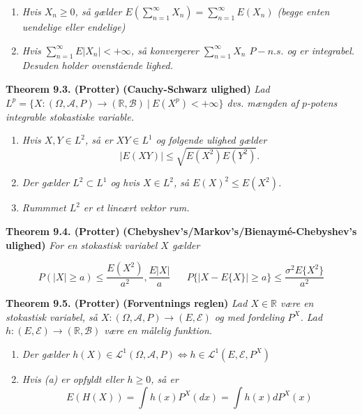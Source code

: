 \documentclass[a4paper,12pt,openany]{book}
\providecommand{\tightlist}{%
 \setlength{\itemsep}{0pt}\setlength{\parskip}{0pt}}
\begin{document}
\begin{enumerate}
\def\labelenumi{\alph{enumi}.}
\tightlist
\item
  \emph{Hvis \(X_n\ge0\), så gælder \(E\left(\sum_{n=1}^\infty X_n\right)=\sum_{n=1}^\infty E(X_n)\) (begge enten uendelige eller endelige)}
\item
  \emph{Hvis \(\sum_{n=1}^\infty E\vert X_n\vert <+\infty\), så konvergerer \(\sum_{n=1}^\infty X_n\) \(P-n.s.\) og er integrabel. Desuden holder ovenstående lighed.}
\end{enumerate}

\textbf{Theorem 9.3. (Protter)} \textbf{(Cauchy-Schwarz ulighed)} \emph{Lad \(L^p=\{X : (\Omega,\mathcal{A},P)\to(\mathbb{R},\mathcal{B})\ \vert\ E(X^p)< +\infty\}\) dvs. mængden af \(p\)-potens integrable stokastiske variable.}

\begin{enumerate}
\def\labelenumi{\alph{enumi}.}
\tightlist
\item
  \emph{Hvis \(X,Y\in L^2\), så er \(XY\in L^1\) og følgende ulighed gælder}
  \[
    \vert E(XY)\vert \le \sqrt{E(X^2)E(Y^2)}.
    \]
\item
  \emph{Der gælder \(L^2\subset L^1\) og hvis \(X\in L^2\), så \(E(X)^2\le E(X^2)\).}
\item
  \emph{Rummmet \(L^2\) er et lineært vektor rum.}
\end{enumerate}

\textbf{Theorem 9.4. (Protter)} \textbf{(Chebyshev's/Markov's/Bienaymé-Chebyshev's ulighed)} \emph{For en stokastisk variabel \(X\) gælder}

\[
P(\vert X\vert \ge a)\le \frac{E(X^2)}{a^2},\frac{E\vert X\vert}{a} \hspace{20pt} P\{\vert X-E\{X\}\vert\ge a\}\le \frac{\sigma^2 E\{X^2\}}{a^2}
\]

\textbf{Theorem 9.5. (Protter)} \textbf{(Forventnings reglen)} \emph{Lad \(X\in \mathbb{R}\) være en stokastisk variabel, så \(X : (\Omega, \mathcal{A}, P)\to (E,\mathcal{E})\) og med fordeling \(P^X\). Lad \(h : (E,\mathcal{E})\to(\mathbb{R},\mathcal{B})\) være en målelig funktion.}

\begin{enumerate}
\def\labelenumi{\alph{enumi}.}
\tightlist
\item
  \emph{Der gælder \(h(X)\in\mathcal{L}^1(\Omega, \mathcal{A}, P)\iff h\in\mathcal{L}^1(E, \mathcal{E}, P^X)\)}
\item
  \emph{Hvis (a) er opfyldt eller \(h\ge 0\), så er}
  \[
    E(H(X))=\int h(x)P^X(dx)=\int h(x)dP^X(x)
    \]
\end{enumerate}
\end{document}
